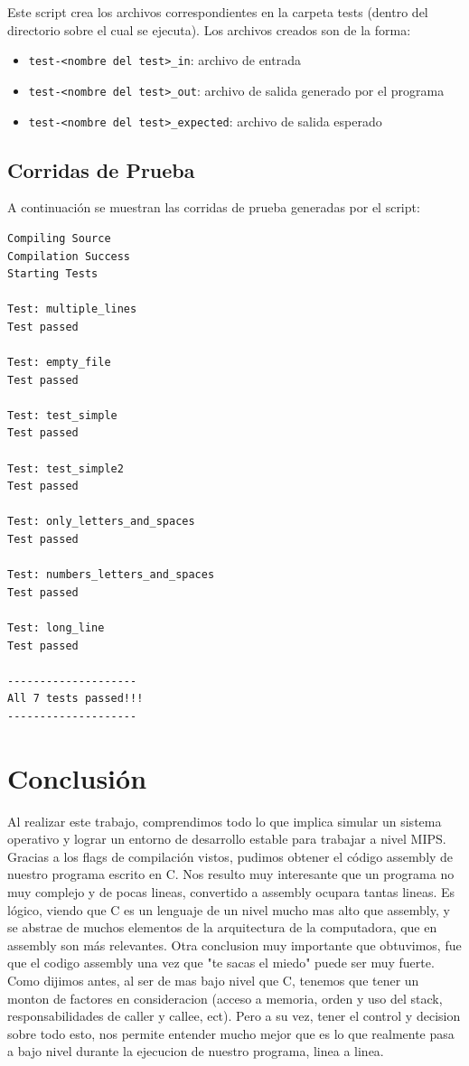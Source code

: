 \documentclass[11pt,a4paper]{article}
\begin{document}
Este script crea los archivos correspondientes en la carpeta tests (dentro del directorio sobre el cual se ejecuta).
Los archivos creados son de la forma:

\begin{itemize}
	\item \texttt{test-<nombre del test>\_in}: archivo de entrada
	\item \texttt{test-<nombre del test>\_out}: archivo de salida generado por el programa
	\item \texttt{test-<nombre del test>\_expected}: archivo de salida esperado
\end{itemize}

\subsection{Corridas de Prueba}
A continuación se muestran las corridas de prueba generadas por el script:

\begin{lstlisting}
Compiling Source
Compilation Success
Starting Tests

Test: multiple_lines
Test passed

Test: empty_file
Test passed

Test: test_simple
Test passed

Test: test_simple2
Test passed

Test: only_letters_and_spaces
Test passed

Test: numbers_letters_and_spaces
Test passed

Test: long_line
Test passed

--------------------
All 7 tests passed!!!
--------------------
\end{lstlisting}



\section{Conclusión}
Al realizar este trabajo, comprendimos todo lo que implica simular un sistema operativo y lograr un entorno de desarrollo estable para trabajar a nivel MIPS.
Gracias a  los flags de compilación vistos, pudimos obtener el código assembly de nuestro programa escrito en C. Nos resulto muy interesante que un programa no muy complejo y de pocas lineas, convertido a assembly ocupara tantas lineas. Es lógico, viendo que C es un lenguaje de un nivel mucho mas alto que assembly, y se abstrae de muchos elementos de la arquitectura de la computadora, que en assembly son más relevantes.
Otra conclusion muy importante que obtuvimos, fue que el codigo assembly una vez que "te sacas el miedo" puede ser muy fuerte. Como dijimos antes, al ser de mas bajo nivel que C, tenemos que tener un monton de factores en consideracion (acceso a memoria, orden y uso del stack, responsabilidades de caller y callee, ect). Pero a su vez, tener el control y decision sobre todo esto, nos permite entender mucho mejor que es lo que realmente pasa a bajo nivel durante la ejecucion de nuestro programa, linea a linea.
\end{document}
